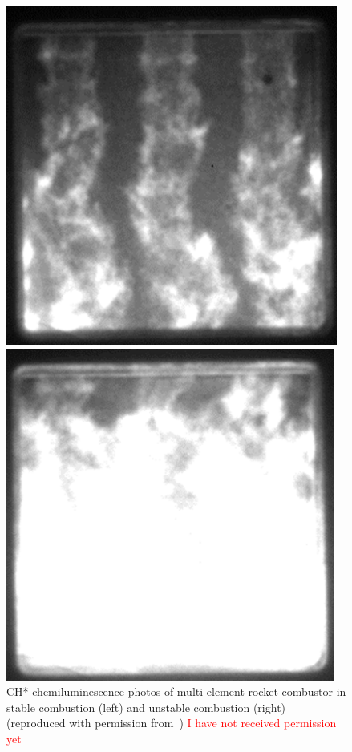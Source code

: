 \begin{figure}
	\begin{minipage}{0.49\linewidth}
		\includegraphics[width=0.98\linewidth]{Chapters/Overview/Images/orth_chChem_stable.png}
	\end{minipage}
	\begin{minipage}{0.49\linewidth}
		\includegraphics[width=0.99\linewidth]{Chapters/Overview/Images/orth_chChem_unstable.png}
	\end{minipage}
	\caption{\label{fig:orthCombustor} CH* chemiluminescence photos of multi-element rocket combustor in stable combustion (left) and unstable combustion (right) (reproduced with permission from~\cite{Orth2018}) \textcolor{red}{I have not received permission yet}}
\end{figure}

